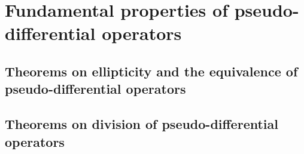 \section{Fundamental properties of pseudo-differential operators}

\subsection{Theorems on ellipticity and the equivalence of pseudo-differential operators}

\subsection{Theorems on division of pseudo-differential operators}